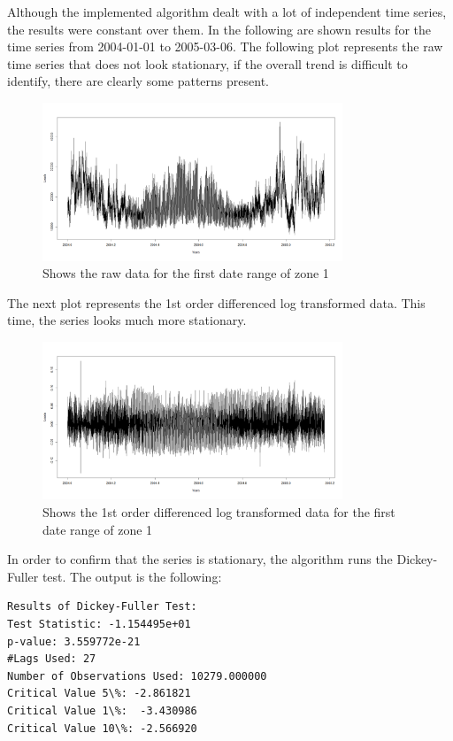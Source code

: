 \documentclass{article} %
\begin{document}
Although the implemented algorithm dealt with a lot of independent time series, the results were constant over them. In the following are shown results for the time series from 2004-01-01 to 2005-03-06.
The following plot represents the raw time series that does not look stationary, if the overall trend is difficult to identify, there are clearly some patterns present.

\begin{figure}[H]
  \centering
    \includegraphics[width=0.80\textwidth]{loadsRawData}
  \caption{Shows the raw data for the first date range of zone 1 }
\end{figure}

The next plot represents the 1st order differenced log transformed data. This time, the series looks much more stationary. 

\begin{figure}[H]
  \centering
    \includegraphics[width=0.80\textwidth]{LoadsStationary}
  \caption{Shows the 1st order differenced log transformed data for the first date range of zone 1 }
\end{figure}

In order to confirm that the series is stationary, the algorithm runs the Dickey-Fuller test. The output is the following:
\begin{verbatim}
Results of Dickey-Fuller Test:
Test Statistic: -1.154495e+01
p-value: 3.559772e-21
#Lags Used: 27
Number of Observations Used: 10279.000000
Critical Value 5\%: -2.861821
Critical Value 1\%:  -3.430986
Critical Value 10\%: -2.566920
\end{verbatim}
\end{document}

